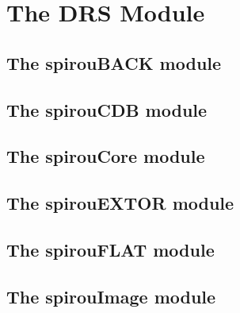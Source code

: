 \chapter{The DRS Module}
\label{ch:the_module}


\section{The spirouBACK module}
\label{ch:the_module:spirouBACK}


\section{The spirouCDB module}
\label{ch:the_module:spirouCDB}


\section{The spirouCore module}
\label{ch:the_module:spirouCore}


\section{The spirouEXTOR module}
\label{ch:the_module:spirouEXTOR}


\section{The spirouFLAT module}
\label{ch:the_module:spirouFLAT}


\section{The spirouImage module}
\label{ch:the_module:spirouImage}


